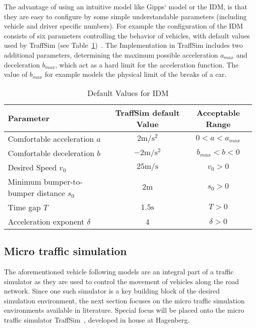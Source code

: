             The advantage of using an intuitive model like Gipps` model or the IDM, is that they are easy to configure by some simple understandable parameters (including vehicle and driver specific numbers).
            For example the configuration of the IDM consists of six parameters controlling the behavior of vehicles, with default values used by TraffSim (see Table~\ref{tab:IDM-Default-Values})~\cite{treiber2013traffic,backfrieder2013traffsim,backfrieder2014traffsim}.
            The Implementation in TraffSim includes two additional parameters, determining the maximum possible acceleration $a_{max}$ and deceleration $b_{max}$, which act as a hard limit for the acceleration function.
            The value of $b_{max}$ for example models the physical limit of the breaks of a car.
            \begin{table}[H]
                \centering
                \begin{tabular}{l c c}
                    Parameter & TraffSim default Value & Acceptable Range \\
                    \hline
                    Comfortable acceleration $a$ & $2 \si{\m\per\s\squared}$ & $ 0 < a < a_{max}$\\
                    Comfortable deceleration $b$ & $-2 \si{\m\per\s\squared}$ & $ b_{max} < b < 0$\\
                    Desired Speed $v_0$ & $25 \si{\m\per\s}$ & $v_0 > 0$ \\
                    Minimum bumper-to-bumper distance $s_0$ & $2 \si{\m}$ & $s_0 > 0$ \\
                    Time gap $T$ & $1.5 \si{\s}$ & $T > 0$\\
                    Acceleration exponent $\delta$ \footnotemark& 4 & $\delta >  0$\\
                \end{tabular}
                \caption{Default Values for IDM}
                \label{tab:IDM-Default-Values}
            \end{table}

        \subsection{Micro traffic simulation}\label{subsec:micro-traffic-simulation}
                The aforementioned vehicle following models are an integral part of a traffic simulator as they are used to control the movement of vehicles along the road network.
                Since one such simulator is a key building block of the desired simulation environment, the next section focuses on the micro traffic simulation environments available in literature.
                Special focus will be placed onto the micro traffic simulator TraffSim~\cite{backfrieder2013traffsim,backfrieder2014traffsim}, developed in house at Hagenberg.
